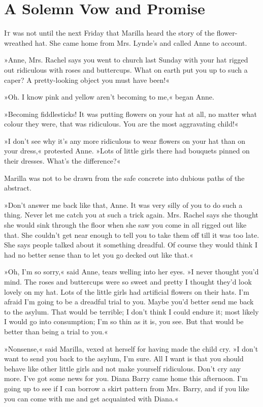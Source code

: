 \chapter{A Solemn Vow and Promise}

\lettrine[lines=4]{I}{t} was not until the next Friday that Marilla heard the story of the flower-wreathed hat. She came home from Mrs. Lynde's and called Anne to account.

\zz
»Anne, Mrs. Rachel says you went to church last Sunday with your hat rigged out ridiculous with roses and buttercups. What on earth put you up to such a caper? A pretty-looking object you must have been!«

»Oh. I know pink and yellow aren't becoming to me,« began Anne.

»Becoming fiddlesticks! It was putting flowers on your hat at all, no matter what colour they were, that was ridiculous. You are the most aggravating child!«

»I don't see why it's any more ridiculous to wear flowers on your hat than on your dress,« protested Anne. »Lots of little girls there had bouquets pinned on their dresses. What's the difference?«

Marilla was not to be drawn from the safe concrete into dubious paths of the abstract.

»Don't answer me back like that, Anne. It was very silly of you to do such a thing. Never let me catch you at such a trick again. Mrs. Rachel says she thought she would sink through the floor when she saw you come in all rigged out like that. She couldn't get near enough to tell you to take them off till it was too late. She says people talked about it something dreadful. Of course they would think I had no better sense than to let you go decked out like that.«

»Oh, I'm so sorry,« said Anne, tears welling into her eyes. »I never thought you'd mind. The roses and buttercups were so sweet and pretty I thought they'd look lovely on my hat. Lots of the little girls had artificial flowers on their hats. I'm afraid I'm going to be a dreadful trial to you. Maybe you'd better send me back to the asylum. That would be terrible; I don't think I could endure it; most likely I would go into consumption; I'm so thin as it is, you see. But that would be better than being a trial to you.«

»Nonsense,« said Marilla, vexed at herself for having made the child cry. »I don't want to send you back to the asylum, I'm sure. All I want is that you should behave like other little girls and not make yourself ridiculous. Don't cry any more. I've got some news for you. Diana Barry came home this afternoon. I'm going up to see if I can borrow a skirt pattern from Mrs. Barry, and if you like you can come with me and get acquainted with Diana.«

